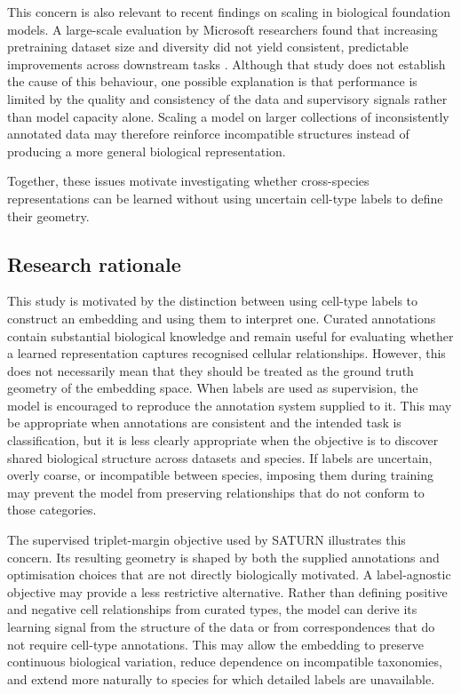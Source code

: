 \documentclass{article}
\begin{document}
This concern is also relevant to recent findings on scaling in biological foundation models. A large-scale evaluation by Microsoft researchers found that increasing pretraining dataset size and diversity did not yield consistent, predictable improvements across downstream tasks \cite{BioScaling}. Although that study does not establish the cause of this behaviour, one possible explanation is that performance is limited by the quality and consistency of the data and supervisory signals rather than model capacity alone. Scaling a model on larger collections of inconsistently annotated data may therefore reinforce incompatible structures instead of producing a more general biological representation.

Together, these issues motivate investigating whether cross-species representations can be learned without using uncertain cell-type labels to define their geometry.


\subsection{Research rationale}
This study is motivated by the distinction between using cell-type labels to construct an embedding and using them to interpret one. Curated annotations contain substantial biological knowledge and remain useful for evaluating whether a learned representation captures recognised cellular relationships. However, this does not necessarily mean that they should be treated as the ground truth geometry of the embedding space. When labels are used as supervision, the model is encouraged to reproduce the annotation system supplied to it. This may be appropriate when annotations are consistent and the intended task is classification, but it is less clearly appropriate when the objective is to discover shared biological structure across datasets and species. If labels are uncertain, overly coarse, or incompatible between species, imposing them during training may prevent the model from preserving relationships that do not conform to those categories.

The supervised triplet-margin objective used by SATURN \cite{SATURN} illustrates this concern. Its resulting geometry is shaped by both the supplied annotations and optimisation choices that are not directly biologically motivated. A label-agnostic objective may provide a less restrictive alternative. Rather than defining positive and negative cell relationships from curated types, the model can derive its learning signal from the structure of the data or from correspondences that do not require cell-type annotations. This may allow the embedding to preserve continuous biological variation, reduce dependence on incompatible taxonomies, and extend more naturally to species for which detailed labels are unavailable.
\end{document}
